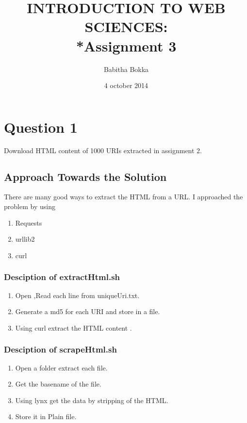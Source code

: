 \documentclass[12pt]{article}
\begin{document}
\begin{titlepage}
\title{INTRODUCTION TO WEB SCIENCES:\\*Assignment 3}
\author{Babitha Bokka}
\date{4 october 2014}
\maketitle
\end{titlepage}

\tableofcontents
\newpage
\section{Question 1}
Download HTML content of 1000 URIs extracted in assignment 2.
\subsection{Approach Towards the Solution}
There are many good ways to extract the HTML from a URL. I approached the problem by using
\begin{enumerate}
	\item Requests
	\item urllib2 
	\item curl 
\end{enumerate}
\subsubsection{Desciption of extractHtml.sh}
\begin{enumerate}
	\item Open ,Read each line from uniqueUri.txt.
	\item Generate a md5 for each URI and store in a file.
	\item Using curl extract the HTML content .
\end{enumerate}
\subsubsection{Desciption of scrapeHtml.sh}
\begin{enumerate}
	\item Open a folder extract each file.
	\item Get the basename of the file.
	\item Using lynx get the data by stripping of the HTML.
	\item Store it in Plain file.
\end{enumerate}
\end{document}
